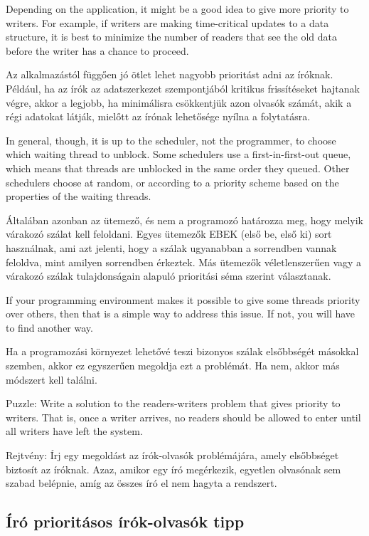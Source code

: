 \documentclass{book}
\newcommand{\clearemptydoublepage}{\newpage\cleardoublepage}
\begin{document}
Depending on the application, it might be a good idea to
give more priority to writers.  For example, if writers are making
time-critical updates to a data structure, it is best
to minimize the number of readers that see the old data before
the writer has a chance to proceed.

Az alkalmazástól függően jó ötlet lehet nagyobb prioritást
adni az íróknak. Például, ha az írók az adatszerkezet szempontjából
kritikus frissítéseket hajtanak végre, akkor a legjobb,
ha minimálisra csökkentjük azon olvasók számát, akik a régi
adatokat látják, mielőtt az írónak lehetősége nyílna a folytatásra.

In general, though, it is up to the scheduler, not the programmer,
to choose which waiting thread to unblock.
Some schedulers use a first-in-first-out queue, which means
that threads are unblocked in the same order they queued.
Other schedulers choose at random, or according to
a priority scheme based on the properties of the waiting
threads.

Általában azonban az ütemező, és nem a programozó határozza meg,
hogy melyik várakozó szálat kell feloldani. Egyes ütemezők
EBEK (első be, első ki) sort használnak, ami azt jelenti, hogy a szálak ugyanabban
a sorrendben vannak feloldva, mint amilyen sorrendben érkeztek.
Más ütemezők véletlenszerűen vagy a várakozó szálak tulajdonságain
alapuló prioritási séma szerint választanak.
   

If your programming environment makes it possible to give
some threads priority over others, then that is a simple way
to address this issue.  If not, you will have to find another
way.

Ha a programozási környezet lehetővé teszi bizonyos szálak
elsőbbségét másokkal szemben, akkor ez egyszerűen megoldja ezt a problémát.
Ha nem, akkor más módszert kell találni.

Puzzle: Write a solution to the readers-writers problem that gives
priority to writers.  That is, once a writer arrives, no readers
should be allowed to enter until all writers have left the system.

Rejtvény: Írj egy megoldást az írók-olvasók problémájára, amely
elsőbbséget biztosít az íróknak. Azaz, amikor egy író megérkezik,
egyetlen olvasónak sem szabad belépnie, amíg az összes író el nem hagyta a rendszert.

\clearemptydoublepage
\subsection{Író prioritásos írók-olvasók tipp}
\end{document}
